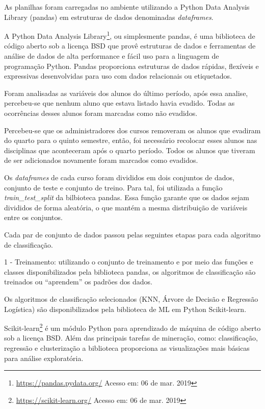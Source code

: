 As planilhas foram carregadas no ambiente utilizando a Python Data Analysis
Library (pandas) em estruturas de dados denominadas \textit{dataframes}.

A Python Data Analysis Library\footnote{\url{https://pandas.pydata.org/} Acesso
em: 06 de mar. 2019}, ou simplesmente pandas, é uma biblioteca de código aberto
sob a licença BSD que provê estruturas de dados e ferramentas de análise de
dados de alta performance e fácil uso para a linguagem de programação Python.
Pandas proporciona estruturas de dados rápidas, flexíveis e expressivas
desenvolvidas para uso com dados relacionais ou etiquetados.

Foram analisadas as variáveis dos alunos do último período, após essa analise,
percebeu-se que nenhum aluno que estava listado havia evadido. Todas as
ocorrências desses alunos foram marcadas como não evadidos.

Percebeu-se que os administradores dos cursos removeram os alunos que evadiram
do quarto para o quinto semestre, então, foi necessário recolocar esses alunos
nas disciplinas que aconteceram após o quarto período. Todos os alunos que
tiveram de ser adicionados novamente foram marcados como evadidos.

Os \textit{dataframes} de cada curso foram divididos em dois conjuntos de dados,
conjunto de teste e conjunto de treino. Para tal, foi utilizada a função
\textit{train\_test\_split} da bilbioteca pandas. Essa função garante que os
dados sejam divididos de forma aleatória, o que mantém a mesma distribuição de
variáveis entre os conjuntos.

Cada par de conjunto de dados passou pelas seguintes etapas para cada algoritmo de
classificação.

1 - Treinamento: utilizando o conjunto de treinamento e por meio das funções e
classes disponibilizados pela biblioteca pandas, os algoritmos de classificação
são treinados ou ``aprendem'' os padrões dos dados.

Os algoritmos de classificação selecionados (KNN, Árvore de Decisão e Regressão
Logística) são disponibilizados pela biblioteca de ML em Python Scikit-learn.

Scikit-learn\footnote{\url{https://scikit-learn.org/} Acesso em: 06 de mar.
2019} é um módulo Python para aprendizado de máquina de código aberto sob a
licença BSD. Além das principais tarefas de mineração, como: classificação,
regressão e clusterização a biblioteca proporciona as visualizações mais básicas
para análise exploratória.

